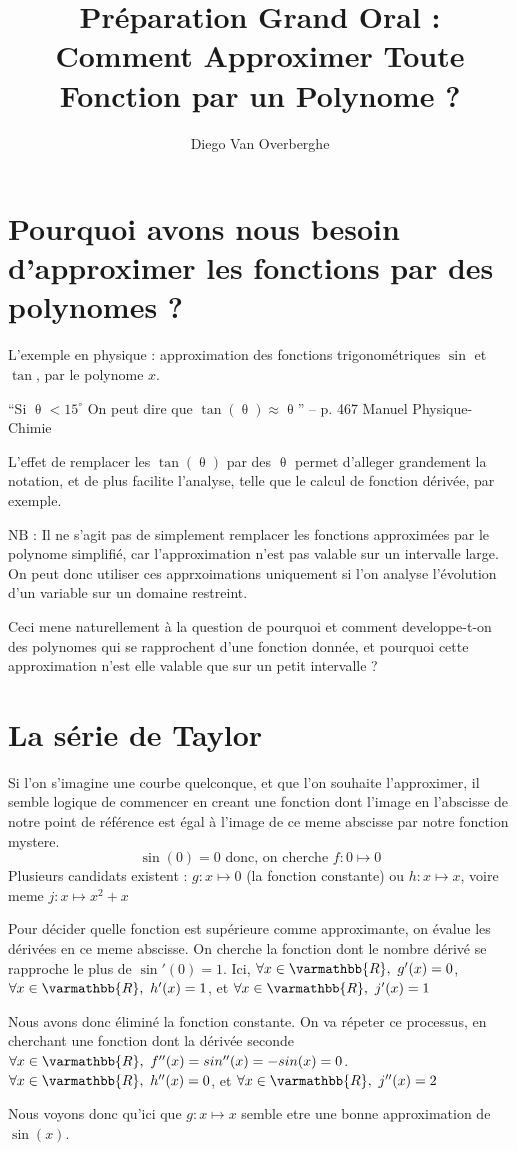 \documentclass{scrartcl}
\title{\vspace{-3cm}Préparation Grand Oral : Comment Approximer Toute Fonction par un Polynome ?}
\author{Diego Van Overberghe}
\begin{document}
    \maketitle
    \section*{Pourquoi avons nous besoin d'approximer les fonctions par des polynomes ?}
    L'exemple en physique : approximation des fonctions trigonométriques $\sin$ et $\tan$, par le polynome $x$.
    \begin{center}
        ``Si $\uptheta<15^{\circ}$ On peut dire que $\tan(\uptheta)\approx\uptheta$'' -- p. 467 Manuel Physique-Chimie
    \end{center}
    L'effet de remplacer les $\tan(\uptheta)$ par des $\uptheta$ permet d'alleger grandement la notation, et de plus facilite l'analyse, telle que le calcul de fonction dérivée, par exemple. 

    $\mathrm{N}\mathrm{B}$ : Il ne s'agit pas de simplement remplacer les fonctions approximées par le polynome simplifié, car l'approximation n'est pas valable sur un intervalle large. On peut donc utiliser ces apprxoimations uniquement si l'on analyse l'évolution d'un variable sur un domaine restreint.

    Ceci mene naturellement à la question de pourquoi et comment developpe-t-on des polynomes qui se rapprochent d'une fonction donnée, et pourquoi cette approximation n'est elle valable que sur un petit intervalle ?

    \section*{La série de Taylor}
    Si l'on s'imagine une courbe quelconque, et que l'on souhaite l'approximer, il semble logique de commencer en creant une fonction dont l'image en l'abscisse de notre point de référence est égal à l'image de ce meme abscisse par notre fonction mystere.
    \[\sin(0)=0\text{ donc, on cherche }f:0\mapsto 0\]
    Plusieurs candidats existent : $g:x\mapsto 0$ (la fonction constante) ou $h:x\mapsto x$, voire meme $j:x\mapsto x^2+x$
    
    Pour décider quelle fonction est supérieure comme approximante, on évalue les dérivées en ce meme abscisse. On cherche la fonction dont le nombre dérivé se rapproche le plus de $\sin'(0)=1$. Ici, $\forall x\in\varmathbb{R},\ g'(x)=0$, $\forall x\in\varmathbb{R},\ h'(x)=1$, et $\forall x\in\varmathbb{R},\ j'(x)=1$

    Nous avons donc éliminé la fonction constante. On va répeter ce processus, en cherchant une fonction dont la dérivée seconde $\forall x\in\varmathbb{R},\ f''(x)=sin''(x)=-sin(x)=0$. $\forall x\in\varmathbb{R},\ h''(x)=0$, et $\forall x\in\varmathbb{R},\ j''(x)=2$

    Nous voyons donc qu'ici que $g:x\mapsto x$ semble etre une bonne approximation de $\sin(x)$.
\end{document}
